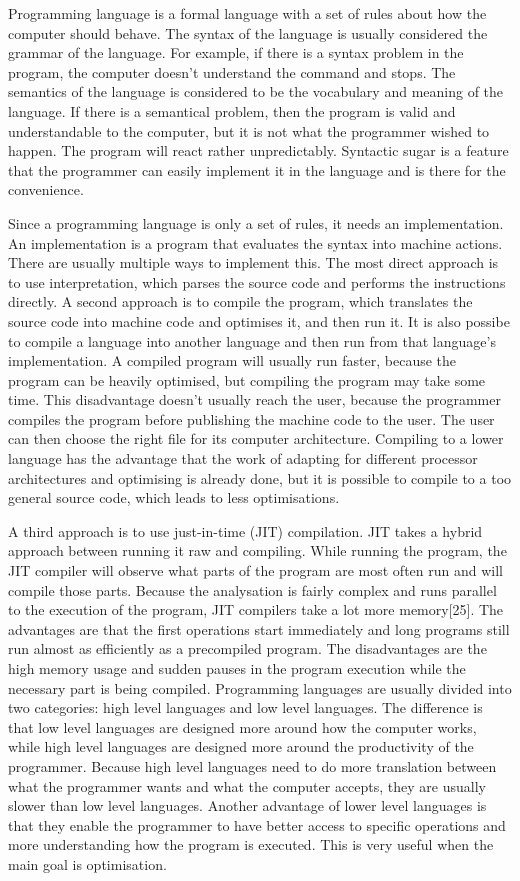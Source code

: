 Programming language is a formal language with a set of rules about how the computer should behave. The syntax of the language is usually considered the grammar of the language. For example, if there is a syntax problem in the program, the computer doesn't understand the command and stops. The semantics of the language is considered to be the vocabulary and meaning of the language. If there is a semantical problem, then the program is valid and understandable to the computer, but it is not what the programmer wished to happen. The program will react rather unpredictably. Syntactic sugar is a feature that the programmer can easily implement it in the language and is there for the convenience.

Since a programming language is only a set of rules, it needs an implementation. An implementation is a program that evaluates the syntax into machine actions. There are usually multiple ways to implement this. The most direct approach is to use interpretation, which parses the source code and performs the instructions directly. A second approach is to compile the program, which translates the source code into machine code and optimises it, and then run it. It is also possibe to compile a language into another language and then run from that language's implementation. A compiled program will usually run faster, because the program can be heavily optimised, but compiling the program may take some time. This disadvantage doesn't usually reach the user, because the programmer compiles the program before  publishing the machine code to the user. The user can then choose the right file for its computer architecture. Compiling to a lower language has the advantage that the work of adapting for different processor architectures and optimising is already done, but it is possible to compile to a too general source code, which leads to less optimisations.

A third approach is to use just-in-time (JIT) compilation. JIT takes a hybrid approach between running it raw and compiling. While running the program, the JIT compiler will observe what parts of the program are most often run and will compile those parts. Because the analysation is fairly complex and runs parallel to the execution of the program, JIT compilers take a lot more memory[25]. The advantages are that the first operations start immediately and long programs still run almost as efficiently as a precompiled program. The disadvantages are the high memory usage and sudden pauses in the program execution while the necessary part is being compiled.
Programming languages are usually divided into two categories: high level languages and low level languages. The difference is that low level languages are designed more around how the computer works, while high level languages are designed more around the productivity of the programmer. Because high level languages need to do more translation between what the programmer wants and what the computer accepts, they are usually slower than low level languages. Another advantage of lower level languages is that they enable the programmer to have better access to specific operations and more understanding how the program is executed. This is very useful when the main goal is optimisation.

